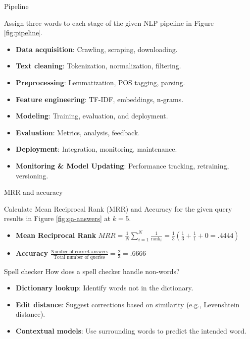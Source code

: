 \documentclass{article}
\begin{document}
\begin{exercise}{Pipeline}
  
  Assign three words to each stage of the given NLP pipeline in Figure \ref{fig:pipeline}.

  \begin{solution}
    \begin{itemize}
      \item \textbf{Data acquisition}: Crawling, scraping, downloading.
      \item \textbf{Text cleaning}: Tokenization, normalization, filtering.
      \item \textbf{Preprocessing}: Lemmatization, POS tagging, parsing.
      \item \textbf{Feature engineering}: TF-IDF, embeddings, n-grams.
      \item \textbf{Modeling}: Training, evaluation, and deployment.
      \item \textbf{Evaluation}: Metrics, analysis, feedback.
      \item \textbf{Deployment}: Integration, monitoring, maintenance.
      \item \textbf{Monitoring \& Model Updating}: Performance tracking, retraining, versioning.
    \end{itemize}
  \end{solution}
\end{exercise}

\begin{exercise}{MRR and accuracy}
  
  Calculate Mean Reciprocal Rank (MRR) and Accuracy for the given query results in Figure \ref{fig:qa-answers} at $k=5$.

  \begin{solution}
    \begin{itemize}
        \item \textbf{Mean Reciprocal Rank} $MRR = \frac{1}{N} \sum_{i=1}^{N} \frac{1}{\text{rank}_i} = \frac{1}{3} (\frac{1}{3}+\frac{1}{1}+0 = .4444)$
        \item \textbf{Accuracy} $\frac{\text{Number of correct answers}}{\text{Total number of queries}} = \frac{2}{3} = .6666$
    \end{itemize}
  \end{solution}
\end{exercise}

\begin{exercise}{Spell checker}
  How does a spell checker handle non-words?

  \begin{solution}
    \begin{itemize}
        \item \textbf{Dictionary lookup}: Identify words not in the dictionary.
        \item \textbf{Edit distance}: Suggest corrections based on similarity (e.g., Levenshtein distance).
        \item \textbf{Contextual models}: Use surrounding words to predict the intended word.
    \end{itemize}
  \end{solution}
\end{exercise}
\end{document}
